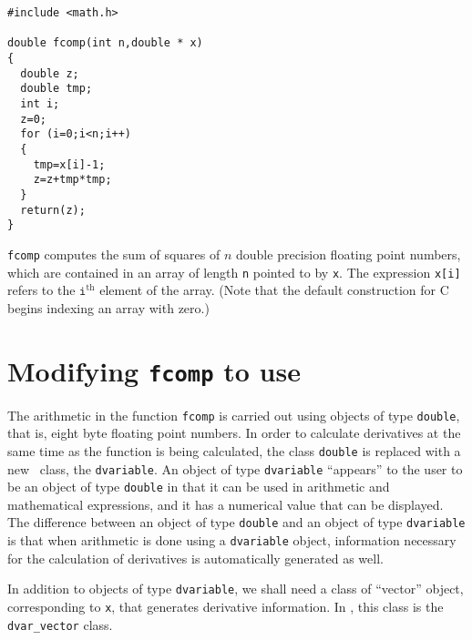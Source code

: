 \documentclass{admbmanual}
\begin{document}
\begin{lstlisting}
#include <math.h>

double fcomp(int n,double * x)
{
  double z;
  double tmp;
  int i;
  z=0;
  for (i=0;i<n;i++)
  {
    tmp=x[i]-1;
    z=z+tmp*tmp;
  }
  return(z);
}
\end{lstlisting}
\texttt{fcomp} computes the sum of squares of $n$ double precision floating
point numbers, which are contained in an array of length \texttt{n} pointed
to by \texttt{x}. The expression \texttt{x[i]} refers to the $\texttt{i}^\textrm{th}$
element of the array. (Note that the default construction for
C begins indexing an array with zero.) 



\section{Modifying \texttt{fcomp} to use \scAD}

The arithmetic 
 in the function \texttt{fcomp} is carried out using
objects of type \texttt{double}, that is, eight byte floating point
numbers. In order to calculate derivatives at the same time
as the function is being calculated, the class \texttt{double}
is replaced with a new \scAD\ class, the \texttt{dvariable}. 
An object of type \texttt{dvariable} ``appears'' to the user to
be an object of type \texttt{double} in that it can be used in
arithmetic and mathematical expressions, and it has a numerical
value that can be displayed. The difference between an object of
type \texttt{double} and an object of type \texttt{dvariable} is that 
when arithmetic is done using a \texttt{dvariable} object, information
necessary for the calculation of derivatives is automatically
generated as well. 

In addition to objects of type \texttt{dvariable}, we shall need
a class of ``vector'' object, corresponding to \texttt{x}, that generates 
derivative information. In \scAD, this class is the \texttt{dvar\_vector}
class. 
\end{document}
